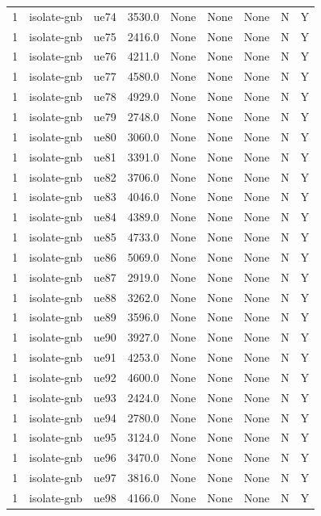 \begin{table}[ht]
\begin{tabular}{|c|c|c|c|c|c|c|c|c|}
1 & isolate-gnb & ue74 & 3530.0 & None & None & None & N & Y \\
1 & isolate-gnb & ue75 & 2416.0 & None & None & None & N & Y \\
1 & isolate-gnb & ue76 & 4211.0 & None & None & None & N & Y \\
1 & isolate-gnb & ue77 & 4580.0 & None & None & None & N & Y \\
1 & isolate-gnb & ue78 & 4929.0 & None & None & None & N & Y \\
1 & isolate-gnb & ue79 & 2748.0 & None & None & None & N & Y \\
1 & isolate-gnb & ue80 & 3060.0 & None & None & None & N & Y \\
1 & isolate-gnb & ue81 & 3391.0 & None & None & None & N & Y \\
1 & isolate-gnb & ue82 & 3706.0 & None & None & None & N & Y \\
1 & isolate-gnb & ue83 & 4046.0 & None & None & None & N & Y \\
1 & isolate-gnb & ue84 & 4389.0 & None & None & None & N & Y \\
1 & isolate-gnb & ue85 & 4733.0 & None & None & None & N & Y \\
1 & isolate-gnb & ue86 & 5069.0 & None & None & None & N & Y \\
1 & isolate-gnb & ue87 & 2919.0 & None & None & None & N & Y \\
1 & isolate-gnb & ue88 & 3262.0 & None & None & None & N & Y \\
1 & isolate-gnb & ue89 & 3596.0 & None & None & None & N & Y \\
1 & isolate-gnb & ue90 & 3927.0 & None & None & None & N & Y \\
1 & isolate-gnb & ue91 & 4253.0 & None & None & None & N & Y \\
1 & isolate-gnb & ue92 & 4600.0 & None & None & None & N & Y \\
1 & isolate-gnb & ue93 & 2424.0 & None & None & None & N & Y \\
1 & isolate-gnb & ue94 & 2780.0 & None & None & None & N & Y \\
1 & isolate-gnb & ue95 & 3124.0 & None & None & None & N & Y \\
1 & isolate-gnb & ue96 & 3470.0 & None & None & None & N & Y \\
1 & isolate-gnb & ue97 & 3816.0 & None & None & None & N & Y \\
1 & isolate-gnb & ue98 & 4166.0 & None & None & None & N & Y \\

\end{tabular}
\end{table}
